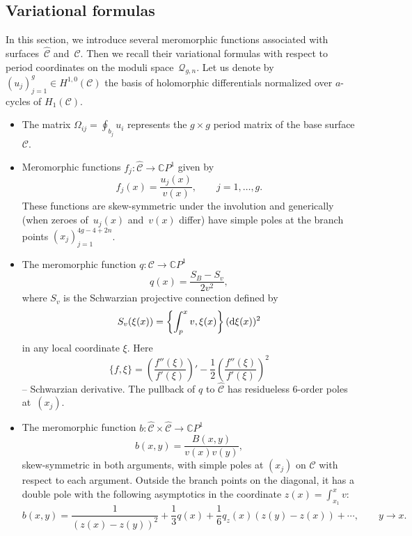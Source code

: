 \documentclass[pdftex]{sigma}
\numberwithin{equation}{section}
\theoremstyle{definition}
\newcommand{\CC}{\mathbb{C}}
\begin{document}
\subsection{Variational formulas}
In this section, we introduce several meromorphic functions associated with surfaces~$\hat{\mathcal{C}}$ and~$\mathcal{C}.$ Then we recall their variational formulas with respect to period coordinates on the moduli space~$\mathcal{Q}_{g,n}$. Let us denote by $(u_j)^{g}_{j=1} \in H^{1,0}({\mathcal{C}})$ the basis of holomorphic differentials normalized over $a$-cycles of $H_1({\mathcal{C}})$.
\begin{itemize}\itemsep=0pt
\item The matrix $\Omega_{ij}=\oint_{b_j}u_i$ represents the $g \times g$ period matrix of the base surface $\mathcal{C}$.

\item Meromorphic functions $f_j\colon \hat{\mathcal{C}} \xrightarrow{} \CC P^1$ given by
\begin{equation*}%
f_j(x)=\frac{u_j(x)}{v(x)}, \qquad j=1,\dots,g.
\end{equation*}
These functions are skew-symmetric under the involution and generically (when zeroes of~$u_j(x)$ and~$v(x)$ differ) have simple poles at the branch points $(x_j)^{4g-4+2n}_{j=1}$.

\item The meromorphic function $q\colon {\mathcal{C}} \xrightarrow{} \CC P^1 $
\begin{equation} \label {q_form} q(x)=\frac{S_B-S_v}{2v^2}, \end{equation}
where $S_v$ is the Schwarzian projective connection defined by
\[
S_v(\xi(x))=\left\{\int^x_{p}v, \xi(x) \right\}({\rm d} \xi(x))^2
\]
 in any local coordinate $\xi$. Here
 \[
 \{f, \xi \}=\left(\frac{f''(\xi)}{f'(\xi)}\right)' -\frac{1}{2}\left(\frac{f''(\xi)}{f'(\xi)}\right)^2
 \] -- Schwarzian derivative. The pullback of $q$ to $\hat{\mathcal{C}}$ has residueless 6-order poles at~$(x_j)$.

\item The meromorphic function $b\colon \hat{\mathcal{C}} \times \hat{\mathcal{C}} \xrightarrow{} \CC P^1 $
\begin{equation*}%
b(x,y)=\frac{B(x,y)}{v(x)v(y)},
\end{equation*}
skew-symmetric in both arguments, with simple poles at $(x_j)$ on $\hat{\mathcal{C}}$ with respect to each argument. Outside the branch points on the diagonal, it has a double pole with the following asymptotics in the coordinate $z(x)=\int^x_{x_1}v$:
\begin{equation*}%
b(x,y)=\frac{1}{(z(x)-z(y))^2}+\frac{1}{3}q(x)+\frac{1}{6}q_z(x)(z(y)-z(x))+\cdots, \qquad y \xrightarrow{} x.
\end{equation*}


\end{itemize}
\end{document}
